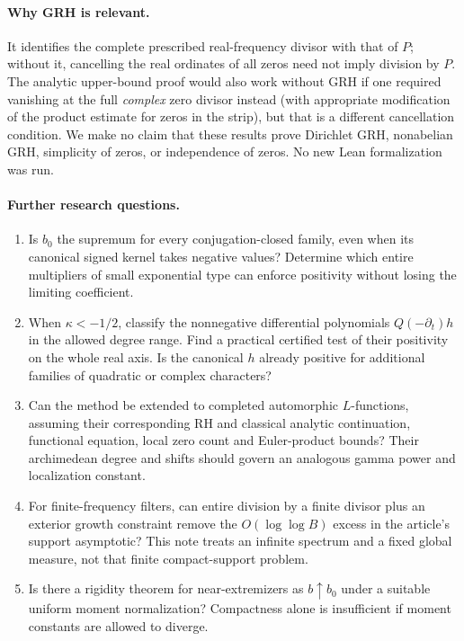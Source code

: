 \documentclass[11pt]{article}
\theoremstyle{definition}\newtheorem{definition}[theorem]{Definition}
\theoremstyle{remark}\newtheorem{remark}[theorem]{Remark}
\begin{document}
\paragraph{Why GRH is relevant.} It identifies the complete prescribed real-frequency divisor with that of $P$; without it, cancelling the real ordinates of all zeros need not imply division by $P$. The analytic upper-bound proof would also work without GRH if one required vanishing at the full \emph{complex} zero divisor instead (with appropriate modification of the product estimate for zeros in the strip), but that is a different cancellation condition. We make no claim that these results prove Dirichlet GRH, nonabelian GRH, simplicity of zeros, or independence of zeros. No new Lean formalization was run.

\paragraph{Further research questions.}
\begin{enumerate}
 \item Is $b_0$ the supremum for every conjugation-closed family, even when its canonical signed kernel takes negative values? Determine which entire multipliers of small exponential type can enforce positivity without losing the limiting coefficient.
 \item When $\kappa<-1/2$, classify the nonnegative differential polynomials $Q(-\partial_t)h$ in the allowed degree range. Find a practical certified test of their positivity on the whole real axis. Is the canonical $h$ already positive for additional families of quadratic or complex characters?
 \item Can the method be extended to completed automorphic $L$-functions, assuming their corresponding RH and classical analytic continuation, functional equation, local zero count and Euler-product bounds? Their archimedean degree and shifts should govern an analogous gamma power and localization constant.
 \item For finite-frequency filters, can entire division by a finite divisor plus an exterior growth constraint remove the $O(\log\log B)$ excess in the article's support asymptotic? This note treats an infinite spectrum and a fixed global measure, not that finite compact-support problem.
 \item Is there a rigidity theorem for near-extremizers as $b\uparrow b_0$ under a suitable uniform moment normalization? Compactness alone is insufficient if moment constants are allowed to diverge.
\end{enumerate}
\end{document}
